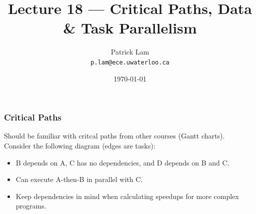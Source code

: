 

\title{Lecture 18 --- Critical Paths, Data \& Task Parallelism }

\author{Patrick Lam \\ \small \texttt{p.lam@ece.uwaterloo.ca}}
\date{\today}




\begin{frame}
  \titlepage

 \end{frame}



\begin{frame}
  \frametitle{Critical Paths}

  

  Should be familiar with critcal paths from other courses (Gantt charts).\\[1em]

  Consider the following diagram (edges are tasks):

\begin{center}
\end{center}

  \begin{itemize}
    \item B depends on A, C has no dependencies, and D depends on B and C.
    \item Can execute A-then-B in parallel with C.
    \item Keep dependencies in mind when calculating speedups for more
      complex programs.
  \end{itemize}
  
\end{frame}

